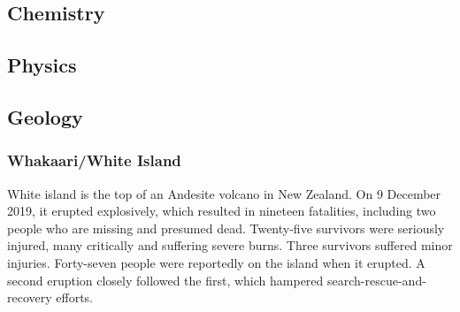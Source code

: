 		\subsection{Chemistry}
		\subsection{Physics}
		\subsection{Geology}
			\subsubsection{Whakaari/White Island}
			White island is the top of an Andesite volcano in New Zealand.  On 9 December 2019, it erupted explosively, which resulted in nineteen fatalities, including two people who are missing and presumed dead. Twenty-five survivors were seriously injured, many critically and suffering severe burns. Three survivors suffered minor injuries. Forty-seven people were reportedly on the island when it erupted. A second eruption closely followed the first, which hampered search-rescue-and-recovery efforts. 
			
		